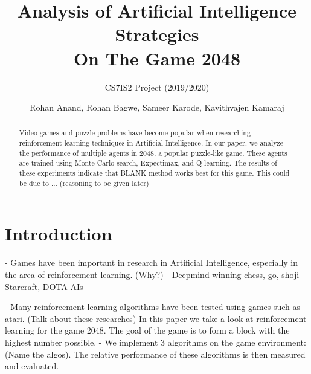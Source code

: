 \documentclass{svproc}
\begin{document}
    \mainmatter
    \title{Analysis of Artificial Intelligence Strategies\\On The Game 2048
    }
    \subtitle{CS7IS2 Project (2019/2020)}
    \author{Rohan Anand, Rohan Bagwe, Sameer Karode, Kavithvajen Kamaraj}


    \maketitle

    \begin{abstract}
        Video games and puzzle problems have become popular when researching reinforcement learning techniques in Artificial Intelligence. In our paper, we analyze the performance of multiple agents in 2048, a popular puzzle-like game. These agents are trained using Monte-Carlo search, Expectimax, and Q-learning. The results of these experiments indicate that BLANK method works best for this game. This could be due to ... (reasoning to be given later)
    \end{abstract}

    \section{Introduction}


    - Games have been important in research in Artificial Intelligence, especially in the area of reinforcement learning. (Why?)
    - Deepmind winning chess, go, shoji
    - Starcraft, DOTA AIs

    - Many reinforcement learning algorithms have been tested using games such as atari. (Talk about these researches)
    In this paper we take a look at reinforcement learning for the game 2048. The goal of the game is to form a block with the highest number possible.
    - We implement 3 algorithms on the game environment: (Name the algos). The relative performance of these algorithms is then measured and evaluated.
\end{document}
